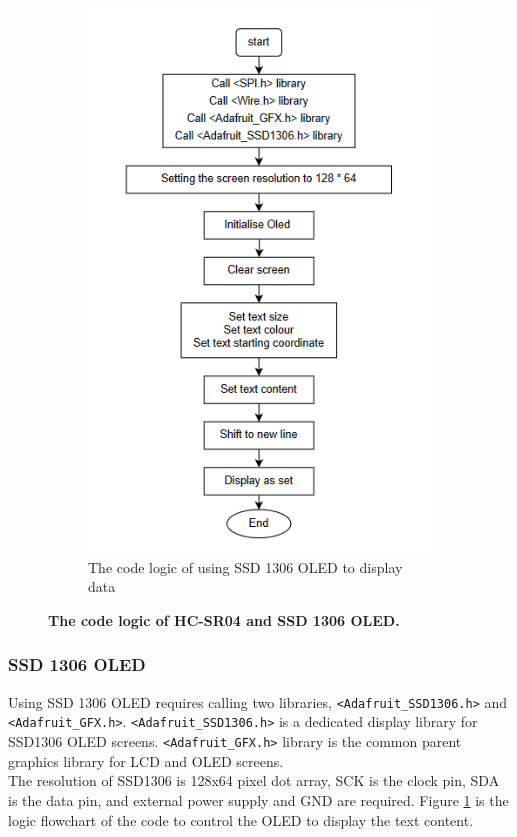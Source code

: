 \begin{figure}[H]
\begin{subfigure}{0.40\textwidth}
        \includegraphics[width=\linewidth]{Image/Design/code_logic_display.png}
        \caption{\centering The code logic of using SSD 1306 OLED to display data}
        \label{fig:cl_oled}
    \end{subfigure}
    \caption[The code logic of HC-SR04 and SSD 1306 OLED]
    {\centering \textbf{The code logic of HC-SR04 and SSD 1306 OLED.}}
    \label{fig:cl_tof_oled}
\end{figure}
\subsubsection{SSD 1306 OLED}
Using SSD 1306 OLED requires calling two libraries, \lstinline{<Adafruit_SSD1306.h>} and 
\lstinline{<Adafruit_GFX.h>}. \lstinline{<Adafruit_SSD1306.h>} is a dedicated display library for SSD1306 OLED 
screens. \lstinline{<Adafruit_GFX.h>} library is the common parent graphics library for LCD and OLED screens. \\
The resolution of SSD1306 is 128x64 pixel dot array, SCK is the clock pin, SDA is the data pin, and external 
power supply and GND are required. Figure \ref{fig:cl_oled} is the logic flowchart of the code to control the 
OLED to display the text content.
\newpage 